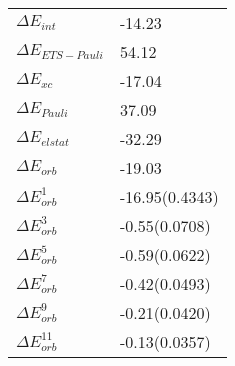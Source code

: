 \begin{table}[]
\caption{}
\label{}
\begin{tabular}{ll}
\hline
$\Delta E_{int}$          &       -14.23             \\
$\Delta E_{ETS-Pauli}$    &        54.12             \\
$\Delta E_{xc}$           &       -17.04             \\
$\Delta E_{Pauli}$        &        37.09             \\
$\Delta E_{elstat}$       &       -32.29             \\
$\Delta E_{orb}$          &       -19.03             \\
$\Delta E^{1}_{orb}$      &       -16.95(0.4343)   \\
$\Delta E^{3}_{orb}$      &        -0.55(0.0708)   \\
$\Delta E^{5}_{orb}$      &        -0.59(0.0622)   \\
$\Delta E^{7}_{orb}$      &        -0.42(0.0493)   \\
$\Delta E^{9}_{orb}$      &        -0.21(0.0420)   \\
$\Delta E^{11}_{orb}$     &        -0.13(0.0357)   \\
\end{tabular}
\end{table}
